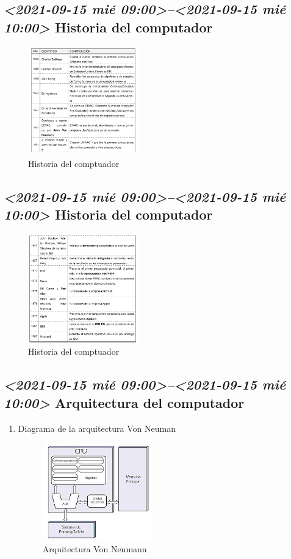 \documentclass[presentation, aspectratio=54]{beamer}
\begin{document}
\subsection{\textit{<2021-09-15 mié 09:00>--<2021-09-15 mié 10:00> } Historia del computador}
\label{sec:org2a6a4d0}

\begin{figure}[htbp]
\centering
\includegraphics[width=180px]{./images/historia1.png}
\caption{Historia del comptuador}
\end{figure}


\subsection{\textit{<2021-09-15 mié 09:00>--<2021-09-15 mié 10:00> } Historia del computador}
\label{sec:orgb5f32b4}

\begin{figure}[htbp]
\centering
\includegraphics[width=180px]{./images/historia2.png}
\caption{Historia del comptuador}
\end{figure}


\subsection{\textit{<2021-09-15 mié 09:00>--<2021-09-15 mié 10:00> } Arquitectura del computador}
\label{sec:org80bb696}
\begin{enumerate}
\item Diagrama de la arquitectura Von Neuman
\label{sec:org45cc008}
\begin{figure}[htbp]
\centering
\includegraphics[width=180px]{./images/Arquitecturaneumann.jpg}
\caption{Arquitectura Von Neumann}
\end{figure}
\end{enumerate}
\end{document}
